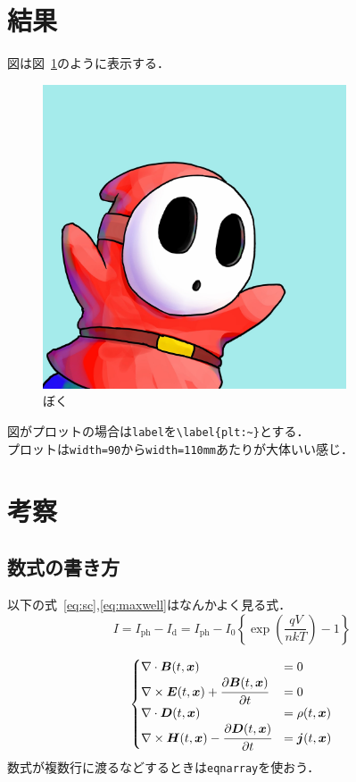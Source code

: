 \documentclass[autodetect-engine,dvipdfmx-if-dvi,ja=standard,a4paper,11pt,titlepage]{bxjsarticle}
\newcommand{\figref}[1]{図~\ref{#1}}
\newcommand{\equref}[1]{式~\eqref{#1}}
\newcommand{\mrm}[1]{\mbox{$_{\mathrm{#1}}$}}
\begin{document}
\section{結果}
図は\figref{fig:5ebec}のように表示する．
\begin{figure}[H]
  \centering
  \includegraphics[width=90mm]{img/5ebec.jpg}
  \caption{ぼく}
  \label{fig:5ebec}
\end{figure}

図がプロットの場合は\verb+label+を\verb+\label{plt:~}+とする．\\
プロットは\verb+width=90+から\verb+width=110mm+あたりが大体いい感じ．
\section{考察}

\subsection{数式の書き方}

以下の\equref{eq:sc},\eqref{eq:maxwell}はなんかよく見る式．
\begin{equation}
  I = I\mrm{ph} - I\mrm{d} = I\mrm{ph} - I_0\left\{\exp\left(\frac{qV}{nkT}\right)-1\right\}
  \label{eq:sc}
\end{equation}

\begin{eqnarray}
  \begin{cases}
    \nabla \cdot \bm{B}(t,\bm{x}) &= 0 \\
    \nabla \times \bm{E}(t,\bm{x}) + {\cfrac {\partial \bm{B}(t,\bm{x})}{\partial t}} &= 0 \\
    \nabla \cdot \bm{D}(t,\bm{x}) &= \rho (t,\bm{x}) \\
    \nabla \times \bm{H}(t,\bm{x})-{\cfrac {\partial \bm{D}(t,\bm{x})}{\partial t}} &= \bm{j}(t,\bm{x})
    \label{eq:maxwell}
  \end{cases}
\end{eqnarray}
数式が複数行に渡るなどするときは\verb+eqnarray+を使おう．
\end{document}
